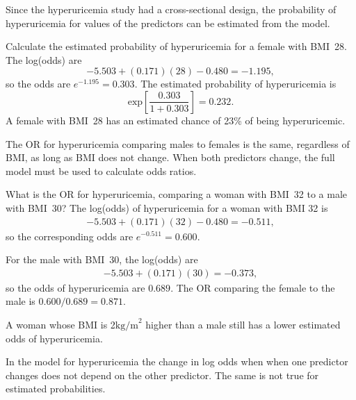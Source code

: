 Since the hyperuricemia study had a cross-sectional design, the probability of hyperuricemia for values of the predictors can be estimated from the model.

\begin{examplewrap}\label{example:huBMISexProbabilities}
\begin{nexample}{Calculate the estimated probability of hyperuricemia for a female with BMI~28.}
The log(odds) are
\[
    -5.503 + (0.171)(28)  - 0.480 = -1.195,
\]
so the odds are $e^{-1.195} = 0.303$.  The estimated probability of hyperuricemia is
\[
   \text{exp}  \left[ \frac{0.303}{1 + 0.303} \right] = 0.232.
\]
A female with BMI~28 has an estimated chance of 23\% of being hyperuricemic.
\end{nexample}
\end{examplewrap}

The OR for hyperuricemia comparing males to females is the same, regardless of BMI, as long as BMI does not change. When both predictors change, the full model must be used to calculate odds ratios.

\begin{examplewrap}\label{example:ORBMI3032}
\begin{nexample}{What is the OR for hyperuricemia, comparing a woman with BMI~32 to a male with BMI~30?}
The log(odds) of hyperuricemia for a woman with BMI 32 is
\begin{align*}
   -5.503 + (0.171)(32) - 0.480 = -0.511,
\end{align*}
so the corresponding odds are $e^{-0.511} = 0.600$.

For the male with BMI~30, the log(odds) are
\begin{align*}
-5.503 + (0.171)(30) = -0.373,
\end{align*}
so the odds of hyperuricemia are $0.689$.
The OR comparing the female to the male is $0.600/0.689 = 0.871$.

A woman whose BMI is 2$\text{kg/m}^2$ higher than a male still has a lower estimated odds of hyperuricemia.
\end{nexample}
\end{examplewrap}

In the model for hyperuricemia the change in log odds when when one predictor changes does not depend on the other predictor.  The same is not true for estimated probabilities.

